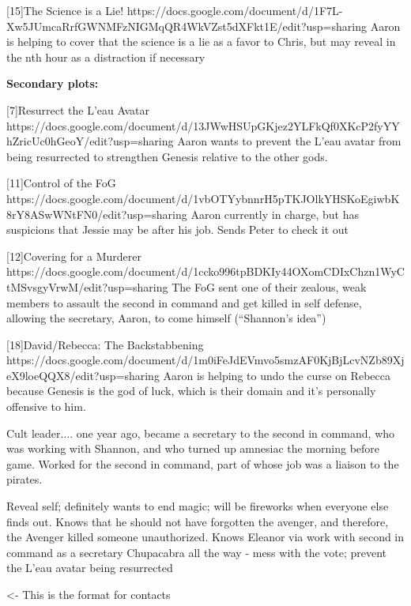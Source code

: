 \documentclass[char]{GL2020}
\begin{document}
[15]The Science is a Lie! https://docs.google.com/document/d/1F7L-Xw5JUmcaRrfGWNMFzNIGMqQR4WkVZst5dXFkt1E/edit?usp=sharing
Aaron is helping to cover that the science is a lie as a favor to Chris, but may reveal in the nth hour as a distraction if necessary


\textbf{Secondary plots:}

[7]Resurrect the L'eau Avatar https://docs.google.com/document/d/13JWwHSUpGKjez2YLFkQf0XKcP2fyYYhZricUc0hGeoY/edit?usp=sharing
Aaron wants to prevent the L’eau avatar from being resurrected to strengthen Genesis relative to the other gods.

[11]Control of the FoG https://docs.google.com/document/d/1vbOTYybnnrH5pTKJOlkYHSKoEgiwbK8rY8ASwWNtFN0/edit?usp=sharing
Aaron currently in charge, but has suspicions that Jessie may be after his job.  Sends Peter to check it out 

[12]Covering for a Murderer https://docs.google.com/document/d/1ccko996tpBDKIy44OXomCDIxChzn1WyCtMSvsgyVrwM/edit?usp=sharing
The FoG sent one of their zealous, weak members to assault the second in command and get killed in self defense, allowing the secretary, Aaron, to come himself ("`Shannon's idea"')

[18]David/Rebecca: The Backstabbening https://docs.google.com/document/d/1m0iFeJdEVmvo5smzAF0KjBjLcvNZb89XjeX9loeQQX8/edit?usp=sharing
Aaron is helping to undo the curse on Rebecca because Genesis is the god of luck, which is their domain and it’s personally offensive to him.


Cult leader.... one year ago, became a secretary to the second in command, who was working with Shannon,  and who turned up amnesiac the morning before game. Worked for the second in command, part of whose job was a liaison to the pirates.

Reveal self; definitely wants to end magic; will be fireworks when everyone else finds out. Knows that he should not have forgotten the avenger, and therefore, the Avenger killed someone unauthorized.	Knows Eleanor via work with second in command as a secretary	Chupacabra all the way - mess with the vote; prevent the L'eau avatar being resurrected


\begin{itemz}[Goals]
	\item 
\end{itemz}

\begin{itemz}[Notes]
	\item 
\end{itemz}

\begin{contacts}
	\contact{\cTest{}} <- This is the format for contacts 
\end{contacts}
\end{document}
